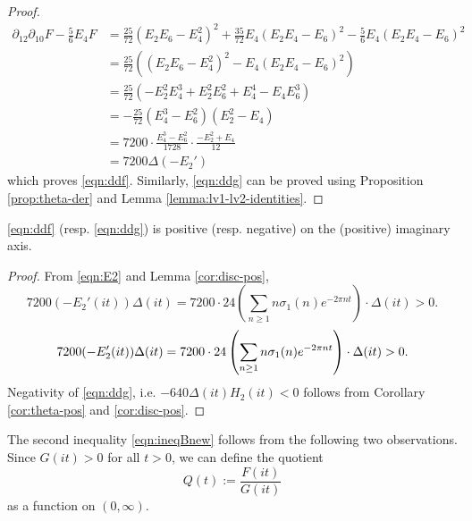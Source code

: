 \begin{proof}
\begin{align}
    \partial_{12}\partial_{10}F - \frac{5}{6} E_4 F &= \frac{25}{72}(E_2 E_6 - E_4^2)^2 + \frac{35}{72} E_4 (E_2 E_4 - E_6)^2 - \frac{5}{6} E_4 (E_2 E_4 - E_6)^2 \\
    &= \frac{25}{72} ((E_2 E_6 - E_4^2)^2 - E_4 (E_2 E_4 - E_6)^2) \\
    &= \frac{25}{72} (- E_2^2 E_4^3 + E_2^2 E_6^2 + E_4^4 - E_4 E_6^3) \\
    &= -\frac{25}{72} (E_4^3 - E_6^2) (E_2^2 - E_4) \\
    &= 7200 \cdot \frac{E_4^3 - E_6^2}{1728} \cdot \frac{-E_2^2 + E_4}{12}\\
    &= 7200 \Delta (-E_2')
\end{align}
which proves \eqref{eqn:ddf}.
Similarly, \eqref{eqn:ddg} can be proved using Proposition \ref{prop:theta-der} and Lemma \ref{lemma:lv1-lv2-identities}.
\end{proof}

\begin{corollary}\label{cor:MLDE-pos}\leanok
\eqref{eqn:ddf} (resp. \eqref{eqn:ddg}) is positive (resp. negative) on the (positive) imaginary axis.
\end{corollary}
\begin{proof}
From \eqref{eqn:E2} and Lemma \ref{cor:disc-pos},
\ifplastex
\begin{equation*}
    7200 (-E_2'(it)) \Delta(it) = 7200 \cdot 24 \left(\sum_{n \ge 1} n \sigma_1(n) e^{-2 \pi n t}\right) \cdot \Delta(it) > 0.
\end{equation*}
\else
\begin{equation}
    7200 (-E_2'(it)) \Delta(it) = 7200 \cdot 24 \left(\sum_{n \ge 1} n \sigma_1(n) e^{-2 \pi n t}\right) \cdot \Delta(it) > 0. \notag
\end{equation}
\fi
Negativity of \eqref{eqn:ddg}, i.e. $-640 \Delta(it) H_2(it) < 0$ follows from Corollary \ref{cor:theta-pos} and \ref{cor:disc-pos}.
\end{proof}


The second inequality \eqref{eqn:ineqBnew} follows from the following two observations.
Since $G(it) > 0$ for all $t > 0$, we can define the quotient
\begin{equation}\label{eqn:Q}
    Q(t) := \frac{F(it)}{G(it)}
\end{equation}
as a function on $(0, \infty)$.


